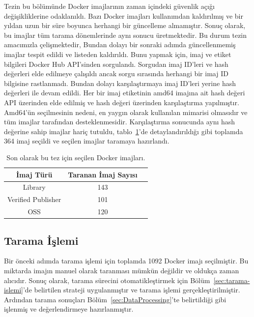 Tezin bu bölümünde Docker imajlarının zaman içindeki güvenlik açığı değişikliklerine odaklanıldı. Bazı Docker imajları kullanımdan kaldırılmış ve bir yıldan uzun bir süre boyunca herhangi bir güncelleme almamıştır. Sonuç olarak, bu imajlar tüm tarama dönemlerinde aynı sonucu üretmektedir. Bu durum tezin amacımızla çelişmektedir, Bundan dolayı bir sonraki adımda güncellenmemiş imajlar tespit edildi ve listeden kaldırıldı. Bunu yapmak için, imaj ve etiket bilgileri Docker Hub API'sinden sorgulandı. Sorgudan imaj ID'leri ve hash değerleri elde edilmeye çalışıldı ancak sorgu sırasında herhangi bir imaj ID bilgisine rastlanmadı. Bundan dolayı karşılaştırmaya imaj ID'leri yerine hash değerleri ile devam edildi. Her bir imaj etiketinin amd64 imajına ait hash değeri API üzerinden elde edilmiş ve hash değeri üzerinden karşılaştırma yapılmıştır. Amd64'ün seçilmesinin nedeni, en yaygın olarak kullanılan mimarisi olmasıdır ve tüm imajlar tarafından desteklenmesidir. Karşılaştırma sonucunda aynı hash değerine sahip imajlar hariç tutuldu, tablo~\ref{tab:final-selected-images}'de detaylandırıldığı gibi toplamda 364 imaj seçildi ve seçilen imajlar taramaya hazırlandı.

\begin{table}
    \caption{Son olarak bu tez için seçilen Docker imajları.}\label{tab:final-selected-images}
    \centering
    \begin{tabular}{ |c|c|c| }
        \hline
        İmaj Türü & Taranan İmaj Sayısı \\
        \hline
        Library & 143 \\
        Verified Publisher & 101 \\
        OSS & 120 \\
        \hline
    \end{tabular}
\end{table}

\subsection{Tarama İşlemi}

Bir önceki adımda tarama işlemi için toplamda 1092 Docker imajı seçilmiştir. Bu miktarda imajın manuel olarak taranması mümkün değildir ve oldukça zaman alıcıdır. Sonuç olarak, tarama sürecini otomatikleştirmek için Bölüm~\ref{sec:tarama-islemi}'de belirtilen strateji uygulanmıştır ve tarama işlemi gerçekleştirilmiştir. Ardından tarama sonuçları Bölüm~\ref{sec:DataProcessing}'te belirtildiği gibi işlenmiş ve değerlendirmeye hazırlanmıştır.

